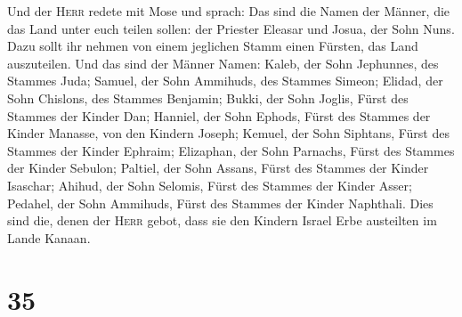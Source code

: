  Und der \textsc{Herr} redete mit Mose und sprach:
 Das sind die Namen der Männer, die das Land unter euch
teilen sollen: der Priester Eleasar und Josua, der Sohn Nuns.
 Dazu sollt ihr nehmen von einem jeglichen Stamm einen
Fürsten, das Land auszuteilen.  Und das sind der Männer
Namen: Kaleb, der Sohn Jephunnes, des Stammes Juda; 
Samuel, der Sohn Ammihuds, des Stammes Simeon;  Elidad,
der Sohn Chislons, des Stammes Benjamin;  Bukki, der Sohn
Joglis, Fürst des Stammes der Kinder Dan;  Hanniel, der
Sohn Ephods, Fürst des Stammes der Kinder Manasse, von den Kindern
Joseph;  Kemuel, der Sohn Siphtans, Fürst des Stammes der
Kinder Ephraim;  Elizaphan, der Sohn Parnachs, Fürst des
Stammes der Kinder Sebulon;  Paltiel, der Sohn Assans,
Fürst des Stammes der Kinder Isaschar;  Ahihud, der Sohn
Selomis, Fürst des Stammes der Kinder Asser;  Pedahel,
der Sohn Ammihuds, Fürst des Stammes der Kinder Naphthali.
 Dies sind die, denen der \textsc{Herr} gebot, dass sie
den Kindern Israel Erbe austeilten im Lande Kanaan.

\hypertarget{section-34}{%
\section{35}\label{section-34}}

